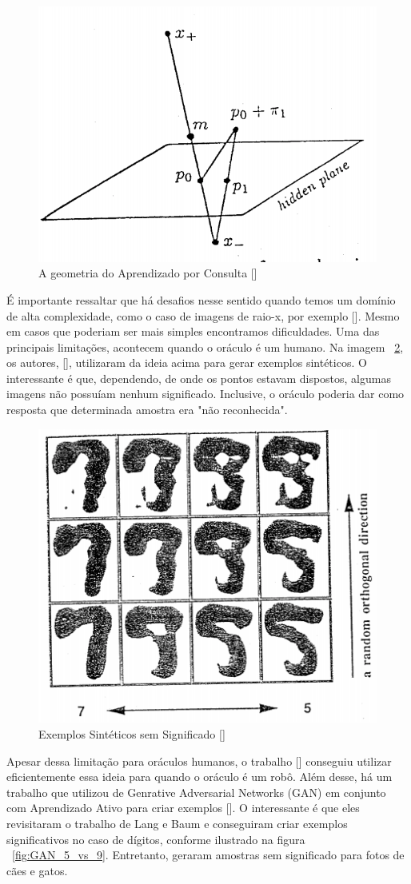 \begin{figure}
  \centering
  \includegraphics[width=.4\textwidth]{figures/lang_baum_geometry_query_learning.png}
  \caption{A geometria do Aprendizado por Consulta [\cite{baum1992query}]}
  \label{fig:LangBaum_GeometryQueryLearning}
\end{figure}

É importante ressaltar que há desafios nesse sentido quando temos um domínio de alta complexidade, como o caso de imagens de raio-x, por exemplo [\cite{angluin1988queries}]. Mesmo em casos que poderiam ser mais simples encontramos dificuldades. Uma das principais limitações, acontecem quando o oráculo é um humano. Na imagem ~\ref{fig:LangBaum_5vs9Example}, os autores, [\cite{baum1992query}], utilizaram da ideia acima para gerar exemplos sintéticos. O interessante é que, dependendo, de onde os pontos estavam dispostos, algumas imagens não possuíam nenhum significado. Inclusive, o oráculo poderia dar como resposta que determinada amostra era "não reconhecida".

\begin{figure}
  \centering
  \includegraphics[width=.4\textwidth]{figures/lang_baum_5_vs_9_example.png}
  \caption{Exemplos Sintéticos sem Significado [\cite{baum1992query}]}
  \label{fig:LangBaum_5vs9Example}
\end{figure}

Apesar dessa limitação para oráculos humanos, o trabalho [\cite{king2004functional, king2009automation}] conseguiu utilizar eficientemente essa ideia para quando o oráculo é um robô. Além desse, há um trabalho que utilizou de Genrative Adversarial Networks (GAN) em conjunto com Aprendizado Ativo para criar exemplos [\cite{zhu2017generative}]. O interessante é que eles revisitaram o trabalho de Lang e Baum e conseguiram criar exemplos significativos no caso de dígitos, conforme ilustrado na figura ~\ref{fig:GAN_5_vs_9}. Entretanto, geraram amostras sem significado para fotos de cães e gatos. 

